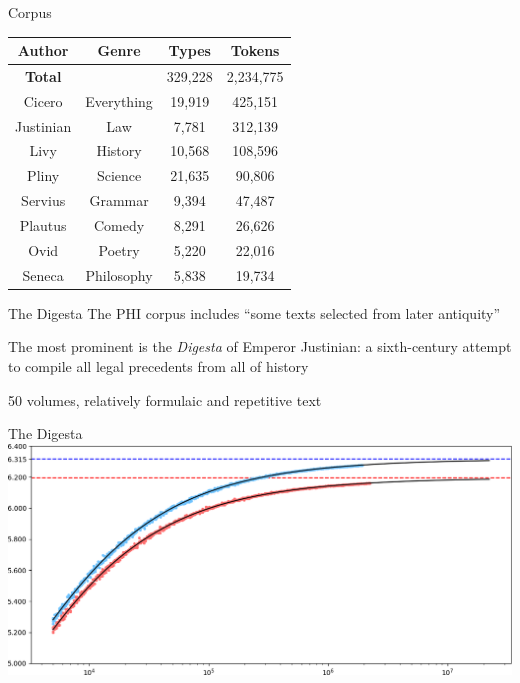 \documentclass{beamer}
\begin{document}
\begin{frame}{Corpus}
\begin{table}
\begin{tabular}{|c|c|c|c|}
\hline
\textbf{Author} & \textbf{Genre} & \textbf{Types} & \textbf{Tokens} \\\hline
\textbf{Total} & & 329,228 & 2,234,775 \\\hline\hline
\rowcolor{yellow}
Cicero & Everything & 19,919 & 425,151 \\\hline
\rowcolor{yellow}
Justinian & Law & 7,781 & 312,139 \\\hline
Livy & History & 10,568 & 108,596 \\\hline
Pliny & Science & 21,635 & 90,806 \\\hline
Servius & Grammar & 9,394 & 47,487 \\\hline
Plautus & Comedy & 8,291 & 26,626 \\\hline
Ovid & Poetry & 5,220 & 22,016 \\\hline
Seneca & Philosophy & 5,838 & 19,734 \\\hline
\end{tabular}
\end{table}
\end{frame}

\begin{frame}{The Digesta}
The PHI corpus includes ``some texts selected from later antiquity''

The most prominent is the \emph{Digesta} of Emperor Justinian: a sixth-century attempt to compile all legal precedents from all of history

50 volumes, relatively formulaic and repetitive text
\end{frame}

\begin{frame}{The Digesta}
\includegraphics[width=\linewidth]{digesta}
\end{frame}
\end{document}

